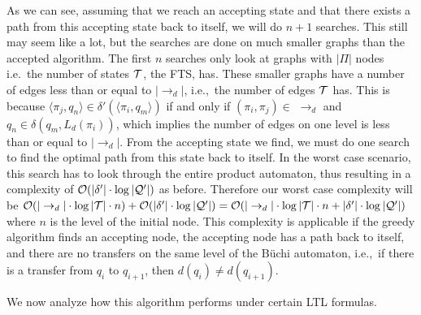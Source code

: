As we can see, assuming that we reach an accepting state and that there exists a path from this accepting state back to itself, we will do $n+1$ searches. This still may seem like a lot, but the searches are done on much smaller graphs than the accepted algorithm. The first $n$ searches only look at graphs with $|\Pi|$ nodes i.e.\ the number of states $\mathcal{T}$, the FTS, has. These smaller graphs have a number of edges less than or equal to $|\rightarrow_d|$, i.e.,\ the number of edges $\mathcal{T}$ has. This is because $\langle \pi_j, q_n \rangle \in \delta' (\langle \pi_i, q_m \rangle )$ if and only if $(\pi_i , \pi_j ) \in$ $\rightarrow_d$ and $q_n \in \delta (q_m, L_d(\pi_i))$, which implies the number of edges on one level is less than or equal to $|\rightarrow_d|$. From the accepting state we find, we must do one search to find the optimal path from this state back to itself. In the worst case scenario, this search has to look through the entire product automaton, thus resulting in a complexity of $\mathcal{O}(|\delta'| \cdot \log|\mathcal{Q}'|)$ as before. Therefore our worst case complexity will be $\mathcal{O}(|\rightarrow_d|\cdot \log |\mathcal{T}| \cdot n) + \mathcal{O}(|\delta'| \cdot \log|\mathcal{Q}'|) = \mathcal{O}(|\rightarrow_d|\cdot \log |\mathcal{T}| \cdot n + |\delta'| \cdot \log|\mathcal{Q}'|)$ where $n$ is the level of the initial node. This complexity is applicable if the greedy algorithm finds an accepting node, the accepting node has a path back to itself, and there are no transfers on the same level of the B\"uchi automaton, i.e.,\ if there is a transfer from $q_i$ to $q_{i+1}$, then $d(q_i) \neq d(q_{i+1})$. %


We now analyze how this algorithm performs under certain LTL formulas. 